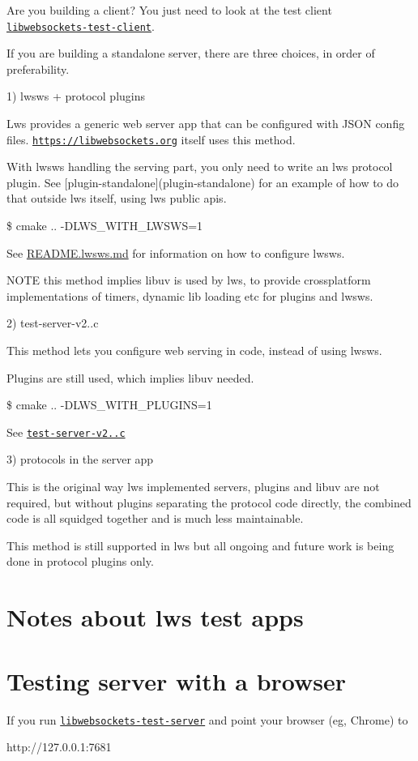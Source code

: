 Are you building a client? You just need to look at the test client \href{test-server/test-client.c}{\tt libwebsockets-\/test-\/client}.

If you are building a standalone server, there are three choices, in order of preferability.

1) lwsws + protocol plugins

Lws provides a generic web server app that can be configured with J\+S\+ON config files. \href{https://libwebsockets.org}{\tt https\+://libwebsockets.\+org} itself uses this method.

With lwsws handling the serving part, you only need to write an lws protocol plugin. See \mbox{[}plugin-\/standalone\mbox{]}(plugin-\/standalone) for an example of how to do that outside lws itself, using lws public apis.

\$ cmake .. -\/\+D\+L\+W\+S\+\_\+\+W\+I\+T\+H\+\_\+\+L\+W\+S\+WS=1

See \hyperlink{md_README.lwsws}{R\+E\+A\+D\+ME.lwsws.md} for information on how to configure lwsws.

N\+O\+TE this method implies libuv is used by lws, to provide crossplatform implementations of timers, dynamic lib loading etc for plugins and lwsws.

2) test-\/server-\/v2..\+c

This method lets you configure web serving in code, instead of using lwsws.

Plugins are still used, which implies libuv needed.

\$ cmake .. -\/\+D\+L\+W\+S\+\_\+\+W\+I\+T\+H\+\_\+\+P\+L\+U\+G\+I\+NS=1

See \href{test-server/test-server-v2.0.c}{\tt test-\/server-\/v2..\+c}

3) protocols in the server app

This is the original way lws implemented servers, plugins and libuv are not required, but without plugins separating the protocol code directly, the combined code is all squidged together and is much less maintainable.

This method is still supported in lws but all ongoing and future work is being done in protocol plugins only.

\section*{Notes about lws test apps }\hypertarget{md_README.test-apps_tsb}{}\section{Testing server with a browser}\label{md_README.test-apps_tsb}
If you run \href{test-server/test-server.c}{\tt libwebsockets-\/test-\/server} and point your browser (eg, Chrome) to \begin{DoxyVerb}    http://127.0.0.1:7681
\end{DoxyVerb}


